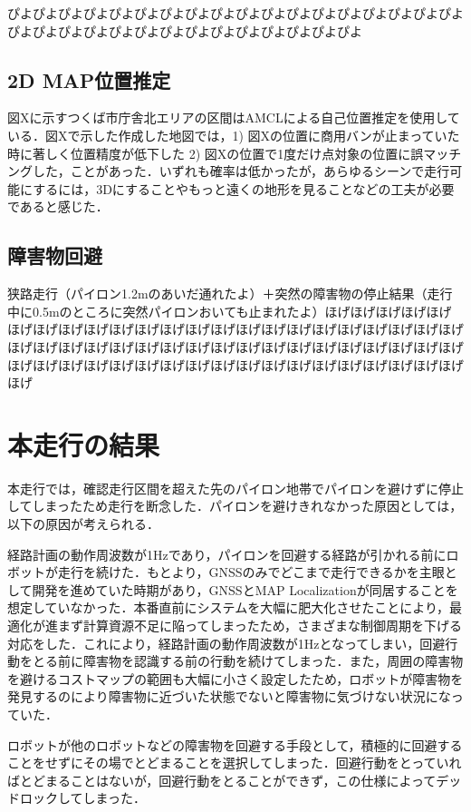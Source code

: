 \documentclass[platex,dvipdfmx]{rbproceedings}
\begin{document}
ぴよぴよぴよぴよぴよぴよぴよぴよぴよぴよぴよぴよぴよぴよぴよぴよぴよぴよぴよぴよぴよぴよぴよぴよぴよぴよぴよぴよぴよぴよぴよぴよ


\subsection{2D MAP位置推定}
図Xに示すつくば市庁舎北エリアの区間はAMCLによる自己位置推定を使用している．図Xで示した作成した地図では，1) 図Xの位置に商用バンが止まっていた時に著しく位置精度が低下した 2) 図Xの位置で1度だけ点対象の位置に誤マッチングした，ことがあった．いずれも確率は低かったが，あらゆるシーンで走行可能にするには，3Dにすることやもっと遠くの地形を見ることなどの工夫が必要であると感じた．

\subsection{障害物回避}
狭路走行（パイロン1.2mのあいだ通れたよ）＋突然の障害物の停止結果（走行中に0.5mのところに突然パイロンおいても止まれたよ）ほげほげほげほげほげほげほげほげほげほげほげほげほげほげほげほげほげほげほげほげほげほげほげほげほげほげほげほげほげほげほげほげほげほげほげほげほげほげほげほげほげほげほげほげほげほげほげほげほげほげほげほげほげほげほげほげほげほげほげほげ

\section{本走行の結果}
本走行では，確認走行区間を超えた先のパイロン地帯でパイロンを避けずに停止してしまったため走行を断念した．パイロンを避けきれなかった原因としては，以下の原因が考えられる．

経路計画の動作周波数が1Hzであり，パイロンを回避する経路が引かれる前にロボットが走行を続けた．もとより，GNSSのみでどこまで走行できるかを主眼として開発を進めていた時期があり，GNSSとMAP Localizationが同居することを想定していなかった．本番直前にシステムを大幅に肥大化させたことにより，最適化が進まず計算資源不足に陥ってしまったため，さまざまな制御周期を下げる対応をした．これにより，経路計画の動作周波数が1Hzとなってしまい，回避行動をとる前に障害物を認識する前の行動を続けてしまった．また，周囲の障害物を避けるコストマップの範囲も大幅に小さく設定したため，ロボットが障害物を発見するのにより障害物に近づいた状態でないと障害物に気づけない状況になっていた．

ロボットが他のロボットなどの障害物を回避する手段として，積極的に回避することをせずにその場でとどまることを選択してしまった．回避行動をとっていればとどまることはないが，回避行動をとることができず，この仕様によってデッドロックしてしまった．
\end{document}
